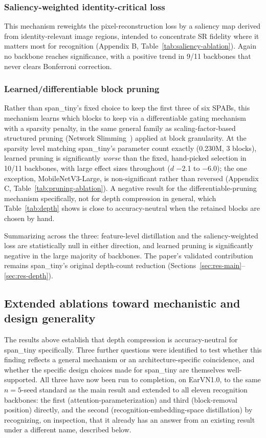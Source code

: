 \documentclass[pdflatex,sn-vancouver-num]{sn-jnl}
\begin{document}
\subsubsection{Saliency-weighted identity-critical loss}

This mechanism reweights the pixel-reconstruction loss by a saliency map derived from identity-relevant image regions, intended to concentrate SR fidelity where it matters most for recognition (Appendix B, Table~\ref{tab:saliency-ablation}). Again no backbone reaches significance, with a positive trend in 9/11 backbones that never clears Bonferroni correction.

\subsubsection{Learned/differentiable block pruning}

Rather than span\_tiny's fixed choice to keep the first three of six SPABs, this mechanism learns which blocks to keep via a differentiable gating mechanism with a sparsity penalty, in the same general family as scaling-factor-based structured pruning (Network Slimming~\cite{liu2017slimming}) applied at block granularity. At the sparsity level matching span\_tiny's parameter count exactly (0.230M, 3 blocks), learned pruning is significantly \emph{worse} than the fixed, hand-picked selection in 10/11 backbones, with large effect sizes throughout ($d$ $-$2.1 to $-$6.0); the one exception, MobileNetV3-Large, is non-significant rather than reversed (Appendix C, Table~\ref{tab:pruning-ablation}). A negative result for the differentiable-pruning mechanism specifically, not for depth compression in general, which Table~\ref{tab:depth} shows is close to accuracy-neutral when the retained blocks are chosen by hand.

Summarizing across the three: feature-level distillation and the saliency-weighted loss are statistically null in either direction, and learned pruning is significantly negative in the large majority of backbones. The paper's validated contribution remains span\_tiny's original depth-count reduction (Sections~\ref{sec:res-main}--\ref{sec:res-depth}).

\subsection{Extended ablations toward mechanistic and design generality}
\label{sec:extended-ablations}

The results above establish that depth compression is accuracy-neutral for span\_tiny specifically. Three further questions were identified to test whether this finding reflects a general mechanism or an architecture-specific coincidence, and whether the specific design choices made for span\_tiny are themselves well-supported. All three have now been run to completion, on EarVN1.0, to the same $n=5$-seed standard as the main result and extended to all eleven recognition backbones: the first (attention-parameterization) and third (block-removal position) directly, and the second (recognition-embedding-space distillation) by recognizing, on inspection, that it already has an answer from an existing result under a different name, described below.
\end{document}
